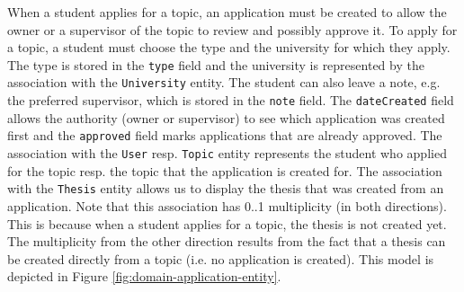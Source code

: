 When a student applies for a topic, an application must be created to allow the owner or a supervisor of the topic to review and possibly approve it. To apply for a topic, a student must choose the type and the university for which they apply. The type is stored in the \texttt{type} field and the university is represented by the association with the \texttt{University} entity. The student can also leave a note, e.g. the preferred supervisor, which is stored in the \texttt{note} field. The \texttt{dateCreated} field allows the authority (owner or supervisor) to see which application was created first and the \texttt{approved} field marks applications that are already approved. The association with the \texttt{User} resp. \texttt{Topic} entity represents the student who applied for the topic resp. the topic that the application is created for. The association with the \texttt{Thesis} entity allows us to display the thesis that was created from an application. Note that this association has 0..1 multiplicity (in both directions). This is because when a student applies for a topic, the thesis is not created yet. The multiplicity from the other direction results from the fact that a thesis can be created directly from a topic (i.e. no application is created). This model is depicted in Figure \ref{fig:domain-application-entity}.

